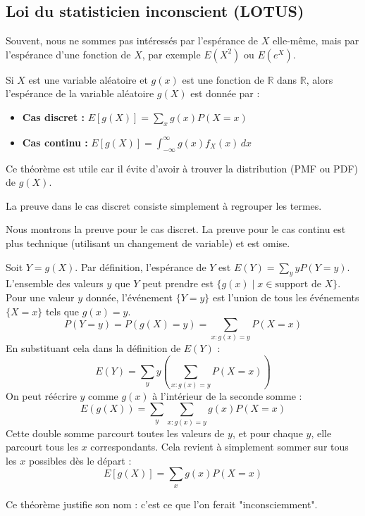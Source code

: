 \subsection{Loi du statisticien inconscient (LOTUS)}

Souvent, nous ne sommes pas intéressés par l'espérance de $X$ elle-même, mais par l'espérance d'une fonction de $X$, par exemple $E(X^2)$ ou $E(e^X)$.

\begin{theorembox}
Si $X$ est une variable aléatoire et $g(x)$ est une fonction de $\mathbb{R}$ dans $\mathbb{R}$, alors l'espérance de la variable aléatoire $g(X)$ est donnée par :
\begin{itemize}
    \item \textbf{Cas discret :} $ E[g(X)] = \sum_x g(x) P(X=x) $
    \item \textbf{Cas continu :} $ E[g(X)] = \int_{-\infty}^{\infty} g(x) f_X(x) \, dx $
\end{itemize}
Ce théorème est utile car il évite d'avoir à trouver la distribution (PMF ou PDF) de $g(X)$.
\end{theorembox}

La preuve dans le cas discret consiste simplement à regrouper les termes.

\begin{proofbox}
Nous montrons la preuve pour le cas discret. La preuve pour le cas continu est plus technique (utilisant un changement de variable) et est omise.

Soit $Y = g(X)$. Par définition, l'espérance de $Y$ est $E(Y) = \sum_y y P(Y=y)$.
L'ensemble des valeurs $y$ que $Y$ peut prendre est $\{g(x) \mid x \in \text{support de } X\}$.
Pour une valeur $y$ donnée, l'événement $\{Y=y\}$ est l'union de tous les événements $\{X=x\}$ tels que $g(x)=y$.
$$ P(Y=y) = P(g(X)=y) = \sum_{x: g(x)=y} P(X=x) $$
En substituant cela dans la définition de $E(Y)$ :
$$ E(Y) = \sum_y y \left( \sum_{x: g(x)=y} P(X=x) \right) $$
On peut réécrire $y$ comme $g(x)$ à l'intérieur de la seconde somme :
$$ E(g(X)) = \sum_y \sum_{x: g(x)=y} g(x) P(X=x) $$
Cette double somme parcourt toutes les valeurs de $y$, et pour chaque $y$, elle parcourt tous les $x$ correspondants. Cela revient à simplement sommer sur tous les $x$ possibles dès le départ :
$$ E[g(X)] = \sum_x g(x) P(X=x) $$
\end{proofbox}

Ce théorème justifie son nom : c'est ce que l'on ferait "inconsciemment".

